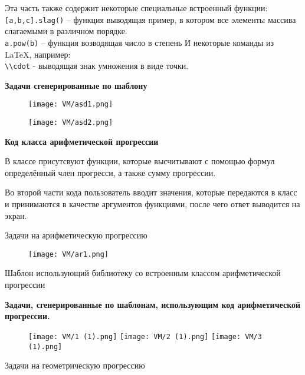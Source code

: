 Эта часть также содержит некоторые специальные встроенный функции:
\\ \texttt{[a,b,c].slag()} – функция выводящая пример, в котором все элементы массива слагаемыми в различном порядке.
\\ \texttt{a.pow(b)} – функция возводящая число в степень
И некоторые команды из LaTeX, например: 
\\  \texttt{\textbackslash \textbackslash cdot} - выводящая знак умножения в виде точки.



\newpage

\textbf{Задачи сгенерированные по шаблону}

\begin{figure}[h]
	\centering
	\texttt{[image: VM/asd1.png]}
	\end{figure}
	\begin{figure}[h]
	\centering
	\texttt{[image: VM/asd2.png]}
\end{figure}


\textbf{Код класса арифметической прогрессии}



В классе присутсвуют функции, которые высчитывают с помощью формул определённый член прогресси, а также сумму прогрессии. 

Во второй части кода пользователь вводит значения, которые передаются в класс и принимаются в качестве аргументов функциями, после чего ответ выводится на экран.

Задачи на арифметическую прогрессию

\begin{figure}[h]
	\centering
	\texttt{[image: VM/ar1.png]}
	\end{figure}
	
Шаблон использующий библиотеку со встроенным классом арифметической прогрессии



\textbf{Задачи, сгенерированные по шаблонам, использующим код арифметической прогрессии.}
	\begin{figure}[h]
		\centering
		\texttt{[image: VM/1 (1).png]}
		\texttt{[image: VM/2 (1).png]}
		\texttt{[image: VM/3 (1).png]}
	\end{figure}


Задачи на геометрическую прогрессию

